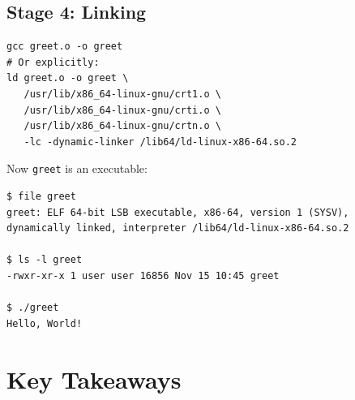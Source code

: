 \subsection{Stage 4: Linking}

\begin{verbatim}
gcc greet.o -o greet
# Or explicitly:
ld greet.o -o greet \
   /usr/lib/x86_64-linux-gnu/crt1.o \
   /usr/lib/x86_64-linux-gnu/crti.o \
   /usr/lib/x86_64-linux-gnu/crtn.o \
   -lc -dynamic-linker /lib64/ld-linux-x86-64.so.2
\end{verbatim}

Now \texttt{greet} is an executable:

\begin{verbatim}
$ file greet
greet: ELF 64-bit LSB executable, x86-64, version 1 (SYSV), dynamically linked, interpreter /lib64/ld-linux-x86-64.so.2

$ ls -l greet
-rwxr-xr-x 1 user user 16856 Nov 15 10:45 greet

$ ./greet
Hello, World!
\end{verbatim}

\section{Key Takeaways}

